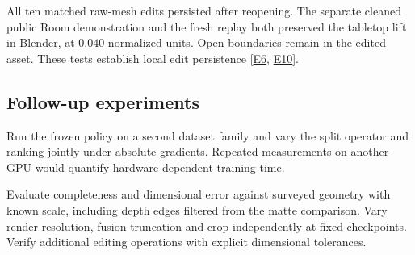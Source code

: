 All ten matched raw-mesh edits persisted after reopening. The separate cleaned public Room demonstration and the fresh replay both preserved the tabletop lift in Blender, at $0.040$ normalized units. Open boundaries remain in the edited asset. These tests establish local edit persistence [\hyperlink{evE6}{E6}, \hyperlink{evE10}{E10}].

\subsection{Follow-up experiments}
Run the frozen policy on a second dataset family and vary the split operator and ranking jointly under absolute gradients. Repeated measurements on another GPU would quantify hardware-dependent training time.

Evaluate completeness and dimensional error against surveyed geometry with known scale, including depth edges filtered from the matte comparison. Vary render resolution, fusion truncation and crop independently at fixed checkpoints. Verify additional editing operations with explicit dimensional tolerances.
